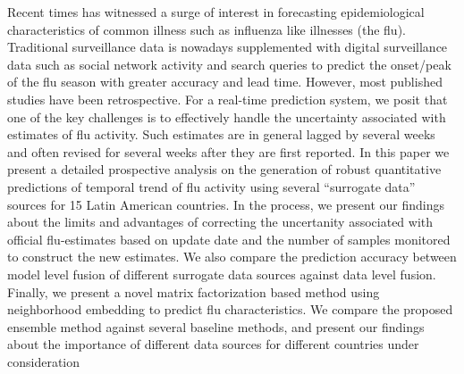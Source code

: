 Recent times has witnessed a surge of interest in forecasting epidemiological 
characteristics of common illness such as influenza like illnesses (the flu).
Traditional surveillance data is nowadays supplemented with digital surveillance data
such as social network activity and search queries to predict the onset/peak of
the flu season with greater accuracy and lead time. However, most published
studies have been retrospective. For a real-time prediction system,
we posit that one of the key challenges is to effectively handle the uncertainty
associated with estimates of flu activity.
Such estimates are in general lagged by several weeks and often revised
for several weeks after they are first reported. In this paper we present a detailed
prospective analysis on the generation of robust quantitative predictions of temporal
trend of flu activity using several ``surrogate data'' sources for 15 Latin American
countries.
In the process, we present our findings about the limits and
advantages of correcting the uncertanity associated with official flu-estimates
based on update date and the number of samples monitored to construct the new estimates.
We also compare the prediction accuracy between model level fusion of different surrogate data sources
against data level fusion. Finally, we present a novel matrix factorization based 
method using neighborhood embedding to predict flu characteristics. 
We compare the proposed ensemble method against several baseline methods, and 
present our findings about the importance of different data 
sources for different countries under consideration
